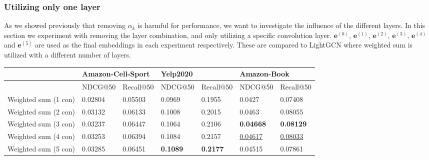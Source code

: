\subsubsection{Utilizing only one layer}
As we showed previously that removing $\alpha_k$ is harmful for performance, we want to investigate the influence of the different layers.
In this section we experiment with removing the layer combination, and only utilizing a specific convolution layer.
$\mathbf{e}^{(0)}$, $\mathbf{e}^{(1)}$, $\mathbf{e}^{(2)}$, $\mathbf{e}^{(3)}$, $\mathbf{e}^{(4)}$ and $\mathbf{e}^{(5)}$ are used as the final embeddings in each experiment respectively.
These are compared to LightGCN where weighted sum is utilized with a different number of layers.
\begin{table}[]
    \centering
    \begin{tabular}{|l|l|l|l|l|l|l|}
        \hline
                             & \multicolumn{2}{l|}{Amazon-Cell-Sport} & \multicolumn{2}{l|}{Yelp2020} & \multicolumn{2}{l|}{Amazon-Book}                                                                 \\ \hline
                             & NDCG@50                                & Recall@50                     & NDCG@50                          & Recall@50         & NDCG@50             & Recall@50           \\ \hline
        Weighted sum (1 con) & 0.02804                                & 0.05503                       & 0.0969                           & 0.1955            & 0.0427              & 0.07408             \\ \hline
        Weighted sum (2 con) & 0.03132                                & 0.06133                       & 0.1008                           & 0.2015            & 0.0463              & 0.08055             \\ \hline
        Weighted sum (3 con) & 0.03237                                & 0.06447                       & 0.1064                           & 0.2106            & \textbf{0.04668}    & \textbf{0.08129}    \\ \hline
        Weighted sum (4 con) & 0.03253                                & 0.06394                       & 0.1084                           & 0.2157            & \underline{0.04617} & \underline{0.08033} \\ \hline
        Weighted sum (5 con) & 0.03285                                & 0.06451                       & \textbf{0.1089}                  & \textbf{0.2177}   & 0.04515             & 0.07861             \\ \hline

\end{tabular}
\end{table}
